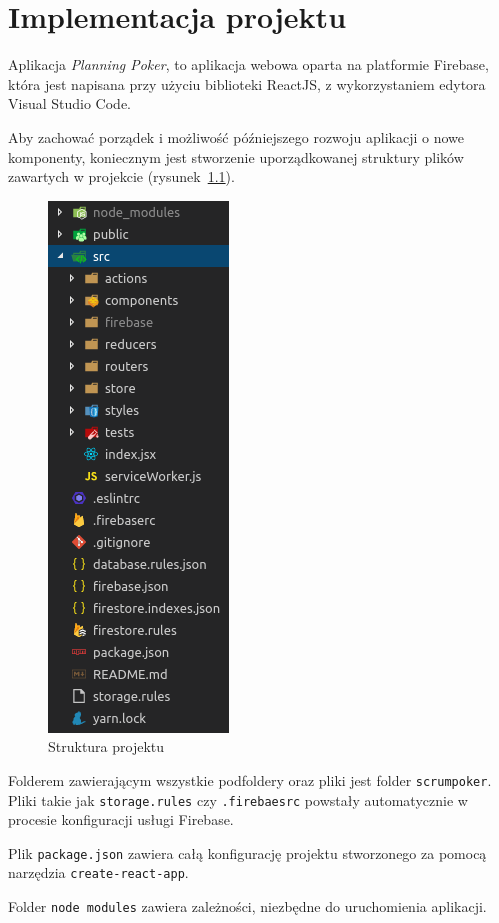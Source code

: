 \chapter{Implementacja projektu}

Aplikacja \textit{Planning Poker}, to aplikacja webowa oparta na platformie Firebase,
która jest napisana przy użyciu biblioteki ReactJS, z wykorzystaniem
edytora Visual Studio Code.

Aby zachować porządek i możliwość późniejszego rozwoju aplikacji o nowe komponenty,
koniecznym jest stworzenie uporządkowanej struktury plików zawartych w projekcie
(rysunek~\ref{rys:projekt}).

\begin{figure}[h]
	\centering\includegraphics[width=.3\textwidth]{img/projekt}
	\caption{Struktura projektu}\label{rys:projekt}%
\end{figure}

Folderem zawierającym wszystkie podfoldery oraz pliki jest folder \texttt{scrumpoker}.
Pliki takie jak \texttt{storage.rules} czy \texttt{.firebaesrc} powstały automatycznie
w procesie konfiguracji usługi Firebase.

Plik \texttt{package.json} zawiera całą konfigurację projektu stworzonego
za pomocą narzędzia \texttt{create-react-app}.

Folder \texttt{node modules} zawiera zależności, niezbędne do uruchomienia aplikacji.

